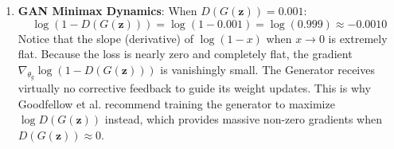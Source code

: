 \begin{enumerate}
    \item \textbf{GAN Minimax Dynamics}:
    When $D(G(\mathbf{z})) = 0.001$:
    \begin{equation*}
    \log(1 - D(G(\mathbf{z}))) = \log(1 - 0.001) = \log(0.999) \approx \mathbf{-0.0010}
    \end{equation*}
    Notice that the slope (derivative) of $\log(1 - x)$ when $x \to 0$ is extremely flat. Because the loss is nearly zero and completely flat, the gradient $\nabla_{\theta_g} \log(1 - D(G(\mathbf{z})))$ is vanishingly small. The Generator receives virtually no corrective feedback to guide its weight updates. This is why Goodfellow et al. recommend training the generator to maximize $\log D(G(\mathbf{z}))$ instead, which provides massive non-zero gradients when $D(G(\mathbf{z})) \approx 0$.
\end{enumerate}
